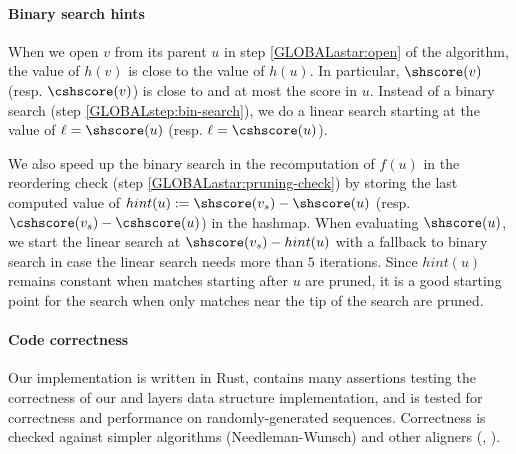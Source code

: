 \paragraph{Binary search hints}
When we open $v$ from its parent $u$ in step \cref{GLOBALastar:open} of the \A
algorithm, the value of $h(v)$ is close to the value of $h(u)$. In particular,
$\shscore(v)$ (resp. $\cshscore(v)$) is close to and at most the score in $u$.
Instead of a binary search (step \cref{GLOBALstep:bin-search}), we do a
linear search starting at the value of $\ell=\shscore(u)$ (resp. $\ell=\cshscore(u)$).

We also speed up the binary search in the recomputation of $f(u)$ in the
reordering check (step \cref{GLOBALastar:pruning-check}) by storing the last computed
value of $hint(u):=\shscore(v_s) - \shscore(u)$ (resp.
$\cshscore(v_s) - \cshscore(u)$) in the hashmap. When evaluating $\shscore(u)$,
we start the linear search at $\shscore(v_s) - hint(u)$ with a fallback to
binary search in case the linear search needs more than $5$ iterations. Since
$hint(u)$ remains constant when matches starting after $u$ are pruned, it is a
good starting point for the search when only matches near the tip of the \A
search are pruned.

\paragraph{Code correctness}
Our implementation \astarpa is written in Rust, contains many assertions testing
\eg the correctness of our \A and layers data structure implementation,
and is tested for correctness and performance on randomly-generated sequences.
Correctness is checked against simpler algorithms (Needleman-Wunsch) and other
aligners (\edlib, \wfa).
